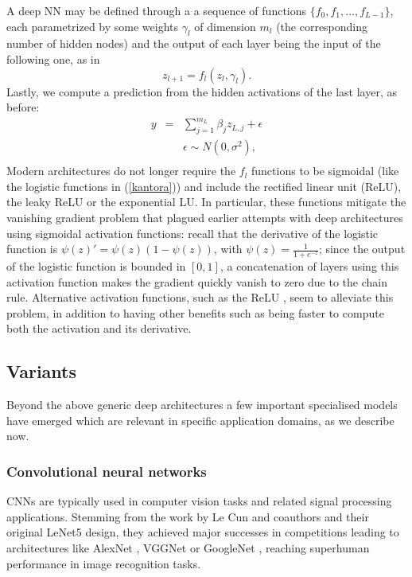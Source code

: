 A deep NN may be defined through a  
a sequence of functions $\lbrace f_0, f_1, ..., f_{L-1} \rbrace$, each parametrized by some weights $\gamma_l$
of dimension $m_l$  (the corresponding number of hidden nodes) and the output of each layer being the input of the following one, as in
$$
    z_{l+1} = f_l ( z_l, \gamma_l).
$$
Lastly, we compute a prediction from the hidden activations of the last layer, as before:
\begin{eqnarray}
y         & = & \sum_{j=1}^{m_L} \beta_j z_{L,j} +
                    \epsilon %
                    \nonumber\\
              & & \epsilon \sim N(0,\sigma^2),
                  \nonumber \\
\end{eqnarray}
Modern architectures do not longer require the
$f_l$ functions to be sigmoidal (like the  
logistic functions in (\ref{kantora})) and include  
the rectified linear unit (ReLU), the leaky ReLU
or the exponential LU. In particular, these functions mitigate the vanishing gradient problem \citep{kolen2001gradient} that 
plagued earlier attempts with deep architectures using sigmoidal
activation functions: recall that the derivative of the logistic function is $\psi(z)' = \psi(z)(1 - \psi(z))$, with $\psi(z) = \frac{1}{1 + e^{-z}}$; since the output of the logistic function is bounded in $\left[ 0, 1 \right]$, a concatenation of layers using this activation function makes the gradient quickly vanish to zero due to the chain rule. Alternative activation functions, such as the ReLU \citep{glorot2010understanding}, seem to alleviate this problem, in addition to having other benefits such as being faster to compute both the activation and its derivative.

\subsection{Variants} 
Beyond the above generic deep architectures 
a few important specialised models have emerged which 
are relevant in specific application domains,
as we describe now. 
\subsubsection{Convolutional neural networks} 
CNNs are typically used 
 in computer vision tasks and related signal processing applications.
 Stemming from the work by Le Cun and coauthors  
  \citep{lecun89, lecun98} and their original 
  LeNet5 design, they achieved major
 successes  in  competitions \citep{krizhevsky2017imagenet}
 leading to architectures like 
 AlexNet       \citep{NIPS2012_c399862d}, VGGNet \citep{simonyan2014very} or
 GoogleNet \citep{szegedy2015going}, reaching 
 superhuman performance in 
 image recognition tasks.
 
